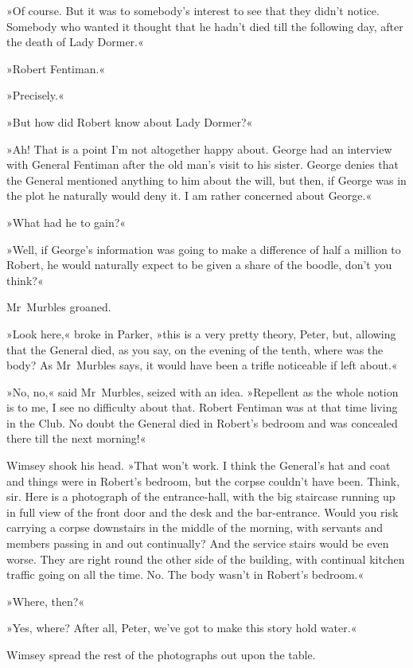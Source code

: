 »Of course. But it was to somebody's interest to see that they didn't notice. Somebody who wanted it thought that he hadn't died till the following day, after the death of Lady Dormer.«

»Robert Fentiman.«

»Precisely.«

»But how did Robert know about Lady Dormer?«

»Ah! That is a point I'm not altogether happy about. George had an interview with General Fentiman after the old man's visit to his sister. George denies that the General mentioned anything to him about the will, but then, if George was in the plot he naturally would deny it. I am rather concerned about George.«

»What had he to gain?«

»Well, if George's information was going to make a difference of half a million to Robert, he would naturally expect to be given a share of the boodle, don't you think?«

Mr~Murbles groaned.

»Look here,« broke in Parker, »this is a very pretty theory, Peter, but, allowing that the General died, as you say, on the evening of the tenth, where was the body? As Mr~Murbles says, it would have been a trifle noticeable if left about.«

»No, no,« said Mr~Murbles, seized with an idea. »Repellent as the whole notion is to me, I see no difficulty about that. Robert Fentiman was at that time living in the Club. No doubt the General died in Robert's bedroom and was concealed there till the next morning!«

Wimsey shook his head. »That won't work. I think the General's hat and coat and things were in Robert's bedroom, but the corpse couldn't have been. Think, sir. Here is a photograph of the entrance-hall, with the big staircase running up in full view of the front door and the desk and the bar-entrance. Would you risk carrying a corpse downstairs in the middle of the morning, with servants and members passing in and out continually? And the service stairs would be even worse. They are right round the other side of the building, with continual kitchen traffic going on all the time. No. The body wasn't in Robert's bedroom.«

»Where, then?«

»Yes, where? After all, Peter, we've got to make this story hold water.«

Wimsey spread the rest of the photographs out upon the table.

